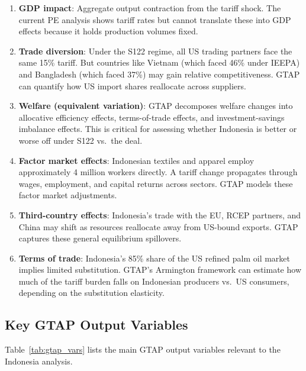 \documentclass[12pt,a4paper]{article}
\begin{document}
\begin{enumerate}
    \item \textbf{GDP impact}: Aggregate output contraction from the tariff shock. The current PE analysis shows tariff rates but cannot translate these into GDP effects because it holds production volumes fixed.

    \item \textbf{Trade diversion}: Under the S122 regime, all US trading partners face the same 15\% tariff. But countries like Vietnam (which faced 46\% under IEEPA) and Bangladesh (which faced 37\%) may gain relative competitiveness. GTAP can quantify how US import shares reallocate across suppliers.

    \item \textbf{Welfare (equivalent variation)}: GTAP decomposes welfare changes into allocative efficiency effects, terms-of-trade effects, and investment-savings imbalance effects. This is critical for assessing whether Indonesia is better or worse off under S122 vs.\ the deal.

    \item \textbf{Factor market effects}: Indonesian textiles and apparel employ approximately 4 million workers directly. A tariff change propagates through wages, employment, and capital returns across sectors. GTAP models these factor market adjustments.

    \item \textbf{Third-country effects}: Indonesia's trade with the EU, RCEP partners, and China may shift as resources reallocate away from US-bound exports. GTAP captures these general equilibrium spillovers.

    \item \textbf{Terms of trade}: Indonesia's 85\% share of the US refined palm oil market implies limited substitution. GTAP's Armington framework can estimate how much of the tariff burden falls on Indonesian producers vs.\ US consumers, depending on the substitution elasticity.
\end{enumerate}

\subsection{Key GTAP Output Variables}

Table~\ref{tab:gtap_vars} lists the main GTAP output variables relevant to the Indonesia analysis.
\end{document}
